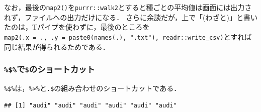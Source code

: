 \documentclass[
]{article}
\newenvironment{Shaded}{\begin{snugshade}}{\end{snugshade}}
\newcommand{\AttributeTok}[1]{\textcolor[rgb]{0.77,0.63,0.00}{#1}}
\newcommand{\FunctionTok}[1]{\textcolor[rgb]{0.00,0.00,0.00}{#1}}
\newcommand{\NormalTok}[1]{#1}
\newcommand{\SpecialCharTok}[1]{\textcolor[rgb]{0.00,0.00,0.00}{#1}}
\newcommand{\StringTok}[1]{\textcolor[rgb]{0.31,0.60,0.02}{#1}}
\begin{document}
なお，最後の\texttt{map2()}を\texttt{purrr::walk2}とすると種ごとの平均値は画面には出力されず，ファイルへの出力だけになる．
さらに余談だが，上で「(わざと)」と書いたのは，Tパイプを使わずに，最後のところを\texttt{map2(.x\ =\ .,\ .y\ =\ paste0(names(.),\ ".txt"),\ readr::write\_csv)}とすれば同じ結果が得られるためである．

\begin{Shaded}
\end{Shaded}

\hypertarget{ux3067ux306eux30b7ux30e7ux30fcux30c8ux30abux30c3ux30c8}{%
\subsubsection{\texorpdfstring{\texttt{\%\$\%}で\texttt{\$}のショートカット}{\%\$\%で\$のショートカット}}\label{ux3067ux306eux30b7ux30e7ux30fcux30c8ux30abux30c3ux30c8}}

\texttt{\%\$\%}は，\texttt{\%\textgreater{}\%}と\texttt{.\$}の組み合わせのショートカットである．

\begin{Shaded}
\end{Shaded}

\begin{verbatim}
## [1] "audi" "audi" "audi" "audi" "audi" "audi"
\end{verbatim}
\end{document}
